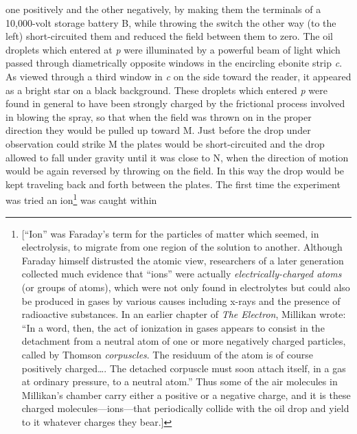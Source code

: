 one positively and the other negatively, by making them the terminals of
a 10,000-volt storage battery B, while throwing the switch the other way
(to the left) short-circuited them and reduced the field between them to
zero. The oil droplets which entered at \emph{p} were illuminated by a
powerful beam of light which passed through diametrically opposite
windows in the encircling ebonite strip \emph{c}. As viewed through a
third window in \emph{c} on the side toward the reader, it appeared as a
bright star on a black background. These droplets which entered \emph{p}
were found in general to have been strongly charged by the frictional
process involved in blowing the spray, so that when the field was thrown
on in the proper direction they would be pulled up toward M. Just before
the drop under observation could strike M the plates would be
short-circuited and the drop allowed to fall under gravity until it was
close to N, when the direction of motion would be again reversed by
throwing on the field. In this way the drop would be kept traveling back
and forth between the plates. The first time the experiment was tried an
ion\footnote{{[}``Ion'' was Faraday's term for the particles of matter
  which seemed, in electrolysis, to migrate from one region of the
  solution to another. Although Faraday himself distrusted the atomic
  view, researchers of a later generation collected much evidence that
  ``ions'' were actually \emph{electrically-charged atoms} (or groups of
  atoms), which were not only found in electrolytes but could also be
  produced in gases by various causes including x-rays and the presence
  of radioactive substances. In an earlier chapter of \emph{The
  Electron}, Millikan wrote: ``In a word, then, the act of ionization in
  gases appears to consist in the detachment from a neutral atom of one
  or more negatively charged particles, called by Thomson
  \emph{corpuscles}. The residuum of the atom is of course positively
  charged\ldots. The detached corpuscle must soon attach itself, in a
  gas at ordinary pressure, to a neutral atom.'' Thus some of the air
  molecules in Millikan's chamber carry either a positive or a negative
  charge, and it is these charged molecules---ions---that periodically
  collide with the oil drop and yield to it whatever charges they
  bear.{]}} was caught within
%
